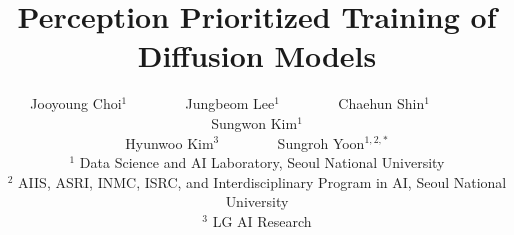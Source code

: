 \documentclass[10pt,twocolumn,letterpaper]{article}
\begin{document}
\title{Perception Prioritized Training of Diffusion Models}

\author{Jooyoung Choi$^1$ ~~~~~~~ Jungbeom Lee$^1$ ~~~~~~~ Chaehun Shin$^1$  ~~~~~~~ Sungwon Kim$^1$ \\ Hyunwoo Kim$^3$ ~~~~~~~ Sungroh Yoon$^{1, 2, *}$\\
$^1$ Data Science and AI Laboratory, Seoul National University\\
$^2$ AIIS, ASRI, INMC, ISRC, and Interdisciplinary Program in AI, Seoul National University\\
$^3$ LG AI Research\\
}


\maketitle










{\small %


}


\end{document}
